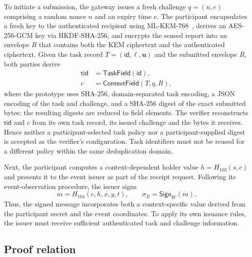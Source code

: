 \documentclass[pdflatex,iicol,sn-mathphys-num]{sn-jnl}
\begin{document}
To initiate a submission, the gateway issues a fresh challenge $q=(n,e)$ comprising a random nonce $n$ and an expiry time $e$. The participant encapsulates a fresh key to the authenticated recipient using ML-KEM-768~\citep{NIST2024MLKEM}, derives an AES-256-GCM key via HKDF-SHA-256, and encrypts the sensed report into an envelope $R$ that contains both the KEM ciphertext and the authenticated ciphertext. Given the task record $T=(\mathsf{id},\boldsymbol{\ell},\boldsymbol u)$ and the submitted envelope $R$, both parties derive
\begin{align}
 \mathsf{tid}&=\mathsf{TaskField}(\mathsf{id}),\\
 c&=\mathsf{ContextField}(T,q,R),
\end{align}
where the prototype uses SHA-256, domain-separated task encoding, a JSON encoding of the task and challenge, and a SHA-256 digest of the exact submitted bytes; the resulting digests are reduced to field elements. The verifier reconstructs $\mathsf{tid}$ and $c$ from its own task record, its issued challenge and the bytes it receives. Hence neither a participant-selected task policy nor a participant-supplied digest is accepted as the verifier's configuration. Task identifiers must not be reused for a different policy within the same deduplication domain.

Next, the participant computes a context-dependent holder value $h=H_{103}(s,c)$ and presents it to the event issuer as part of the receipt request. Following its event-observation procedure, the issuer signs
\begin{equation}
 m=H_{104}(c,h,x,y,t), \qquad \sigma_E=\mathsf{Sign}_{W}(m).
 \label{eq:receipt}
\end{equation}
Thus, the signed message incorporates both a context-specific value derived from the participant secret and the event coordinates. To apply its own issuance rules, the issuer must receive sufficient authenticated task and challenge information.

\subsection{Proof relation}
\label{sec:relation}
\end{document}
